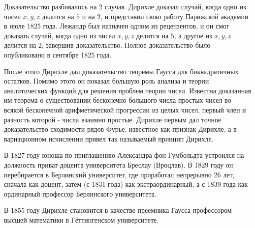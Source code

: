 Доказательство разбивалось на 2 случая. Дирихле доказал случай, когда одно из чисел $x,y,z$ делится на $5$ и на $2$, и представил свою работу Парижской академии в июле 1825 года. Лежандр был назначен одним из рецензентов, и он смог доказать случай, когда одно из чисел $x, y, z$ делится на $5$, а другое из $x, y, z$ делится на 2, завершив доказательство. Полное доказательство было опубликовано в сентябре 1825 года. 

После этого Дирихле дал доказательство теоремы Гаусса для биквадратичных остатков. Помимо этого он показал большую роль анализа и теории аналитических функций для решения проблем теории чисел. Известна доказанная им теорема о существовании бесконечно большого числа простых чисел во всякой бесконечной арифметической прогрессии из целых чисел, первый член и разность которой - числа взаимно простые. Дирихле первым дал точное доказательство сходимости рядов Фурье, известное как признак Дирихле, а в вариационном исчислении привел так называемый принцип Дирихле.

В 1827 году юноша по приглашению Александра фон Гумбольдта устроился на должность приват-доцента университета Бреслау (Вроцлав). В 1829 году он перебирается в Берлинский университет, где проработал непрерывно 26 лет, сначала как доцент, затем (с 1831 года) как экстраординарный, а с 1839 года как ординарный профессор Берлинского университета.

В 1855 году Дирихле становится в качестве преемника Гаусса профессором высшей математики в Гёттингенском университете. 